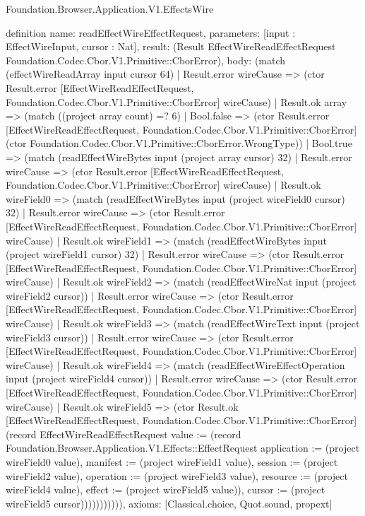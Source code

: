\begin{lexlean}{Foundation.Browser.Application.V1.EffectsWire}
\begin{semanticmodule}
definition{
  name: readEffectWireEffectRequest,
  parameters: [input : EffectWireInput, cursor : Nat],
  result: (Result EffectWireReadEffectRequest Foundation.Codec.Cbor.V1.Primitive::CborError),
  body: (match (effectWireReadArray input cursor 64)
    | Result.error wireCause => (ctor Result.error [EffectWireReadEffectRequest, Foundation.Codec.Cbor.V1.Primitive::CborError] wireCause)
    | Result.ok array => (match ((project array count) =? 6)
      | Bool.false => (ctor Result.error [EffectWireReadEffectRequest, Foundation.Codec.Cbor.V1.Primitive::CborError] (ctor Foundation.Codec.Cbor.V1.Primitive::CborError.WrongType))
      | Bool.true => (match (readEffectWireBytes input (project array cursor) 32)
        | Result.error wireCause => (ctor Result.error [EffectWireReadEffectRequest, Foundation.Codec.Cbor.V1.Primitive::CborError] wireCause)
        | Result.ok wireField0 => (match (readEffectWireBytes input (project wireField0 cursor) 32)
          | Result.error wireCause => (ctor Result.error [EffectWireReadEffectRequest, Foundation.Codec.Cbor.V1.Primitive::CborError] wireCause)
          | Result.ok wireField1 => (match (readEffectWireBytes input (project wireField1 cursor) 32)
            | Result.error wireCause => (ctor Result.error [EffectWireReadEffectRequest, Foundation.Codec.Cbor.V1.Primitive::CborError] wireCause)
            | Result.ok wireField2 => (match (readEffectWireNat input (project wireField2 cursor))
              | Result.error wireCause => (ctor Result.error [EffectWireReadEffectRequest, Foundation.Codec.Cbor.V1.Primitive::CborError] wireCause)
              | Result.ok wireField3 => (match (readEffectWireText input (project wireField3 cursor))
                | Result.error wireCause => (ctor Result.error [EffectWireReadEffectRequest, Foundation.Codec.Cbor.V1.Primitive::CborError] wireCause)
                | Result.ok wireField4 => (match (readEffectWireEffectOperation input (project wireField4 cursor))
                  | Result.error wireCause => (ctor Result.error [EffectWireReadEffectRequest, Foundation.Codec.Cbor.V1.Primitive::CborError] wireCause)
                  | Result.ok wireField5 => (ctor Result.ok [EffectWireReadEffectRequest, Foundation.Codec.Cbor.V1.Primitive::CborError] (record EffectWireReadEffectRequest {value := (record Foundation.Browser.Application.V1.Effects::EffectRequest {application := (project wireField0 value), manifest := (project wireField1 value), session := (project wireField2 value), operation := (project wireField3 value), resource := (project wireField4 value), effect := (project wireField5 value)}), cursor := (project wireField5 cursor)})))))))))),
  axioms: [Classical.choice, Quot.sound, propext]
}


\end{semanticmodule}
\end{lexlean}
